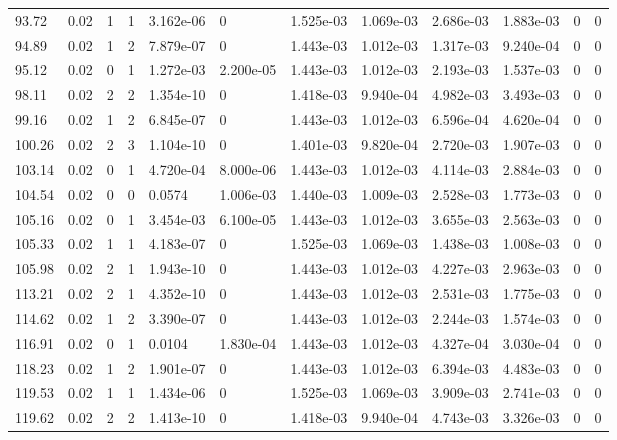 \documentclass[preview]{standalone}
\begin{document}
{{{\begin{tabular}{L{1.2cm}C{1.2cm} C{0.3cm}C{0.5cm} C{1.4cm}C{1.4cm} C{1.4cm}C{1.4cm} C{1.6cm}C{1.6cm} C{1.6cm}C{1.6cm}}
  93.72  &  0.02  & 1     &  1 &  3.162e-06  & 0  &  1.525e-03&   1.069e-03& 2.686e-03 & 1.883e-03   &  0 & 0  \\ 
  94.89  &  0.02  & 1     &  2 &  7.879e-07  & 0  &  1.443e-03&   1.012e-03& 1.317e-03 & 9.240e-04   &  0 & 0  \\ 
  95.12  &  0.02  & 0     &  1 &  1.272e-03  & 2.200e-05  &  1.443e-03&   1.012e-03& 2.193e-03 & 1.537e-03   &  0 & 0  \\ 
  98.11  &  0.02  & 2     &  2 &  1.354e-10  & 0  &  1.418e-03&   9.940e-04& 4.982e-03 & 3.493e-03   &  0 & 0  \\ 
  99.16  &  0.02  & 1     &  2 &  6.845e-07  & 0  &  1.443e-03&   1.012e-03& 6.596e-04 & 4.620e-04   &  0 & 0  \\ 
  100.26  &  0.02  & 2     &  3 &  1.104e-10  & 0  &  1.401e-03&   9.820e-04& 2.720e-03 & 1.907e-03   &  0 & 0  \\ 
  103.14  &  0.02  & 0     &  1 &  4.720e-04  & 8.000e-06  &  1.443e-03&   1.012e-03& 4.114e-03 & 2.884e-03   &  0 & 0  \\ 
  104.54  &  0.02  & 0     &  0 &  0.0574  & 1.006e-03  &  1.440e-03&   1.009e-03& 2.528e-03 & 1.773e-03   &  0 & 0  \\ 
  105.16  &  0.02  & 0     &  1 &  3.454e-03  & 6.100e-05  &  1.443e-03&   1.012e-03& 3.655e-03 & 2.563e-03   &  0 & 0  \\ 
  105.33  &  0.02  & 1     &  1 &  4.183e-07  & 0  &  1.525e-03&   1.069e-03& 1.438e-03 & 1.008e-03   &  0 & 0  \\ 
  105.98  &  0.02  & 2     &  1 &  1.943e-10  & 0  &  1.443e-03&   1.012e-03& 4.227e-03 & 2.963e-03   &  0 & 0  \\ 
  113.21  &  0.02  & 2     &  1 &  4.352e-10  & 0  &  1.443e-03&   1.012e-03& 2.531e-03 & 1.775e-03   &  0 & 0  \\ 
  114.62  &  0.02  & 1     &  2 &  3.390e-07  & 0  &  1.443e-03&   1.012e-03& 2.244e-03 & 1.574e-03   &  0 & 0  \\ 
  116.91  &  0.02  & 0     &  1 &  0.0104  & 1.830e-04  &  1.443e-03&   1.012e-03& 4.327e-04 & 3.030e-04   &  0 & 0  \\ 
  118.23  &  0.02  & 1     &  2 &  1.901e-07  & 0  &  1.443e-03&   1.012e-03& 6.394e-03 & 4.483e-03   &  0 & 0  \\ 
  119.53  &  0.02  & 1     &  1 &  1.434e-06  & 0  &  1.525e-03&   1.069e-03& 3.909e-03 & 2.741e-03   &  0 & 0  \\ 
  119.62  &  0.02  & 2     &  2 &  1.413e-10  & 0  &  1.418e-03&   9.940e-04& 4.743e-03 & 3.326e-03   &  0 & 0  \\ 

\end{tabular}}}}
\end{document}
